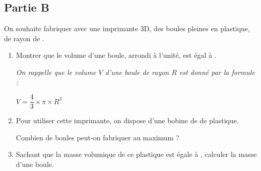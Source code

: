 \documentclass[exercice,a4]{thedocument}%
\begin{document}
\subsection*{Partie B}
On souhaite fabriquer avec une imprimante 3D, des boules pleines en plastique, de rayon de .

\begin{enumerate}
	\item Montrer que le volume d'une boule, arrondi à l'unité, est égal à .

	\emph{On rappelle que le volume $V$ d'une boule de rayon $R$ est donné par la formule :}

	$V=\dfrac{4}{3} \times \pi \times R^{3}$

	\item Pour utiliser cette imprimante, on dispose d'une bobine de  de plastique.

	Combien de boules peut-on fabriquer au maximum ?

	\item Sachant que la masse volumique de ce plastique est égale à , calculer la masse d'une boule.
\end{enumerate}

\medskip
\showthesource
\end{document}
